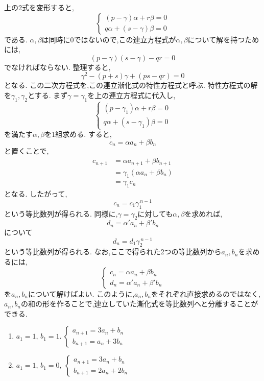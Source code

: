     上の2式を変形すると,
    \[
    \begin{cases}
      (p-\gamma)\alpha+r\beta=0\\
      q\alpha+(s-\gamma)\beta=0
    \end{cases}
    \]
    である.
    $\alpha,\beta$は同時に$0$ではないので,この連立方程式が$\alpha,\beta$について解を持つためには,
    \[
      (p-\gamma)(s-\gamma)-qr=0
    \]
    でなければならない.
    整理すると,
    \[
      \gamma^2-(p+s)\gamma+(ps-qr)=0
    \]
    となる.
    この二次方程式を,この連立漸化式の特性方程式と呼ぶ.
    特性方程式の解を$\gamma_1,\gamma_2$とする.
    まず$\gamma=\gamma_1$を上の連立方程式に代入し,
    \[
      \begin{cases}
        (p-\gamma_1)\alpha+r\beta=0\\
        q\alpha+(s-\gamma_1)\beta=0
      \end{cases}
    \]
    を満たす$\alpha,\beta$を1組求める.
    すると,
    \[
      c_n=\alpha a_n+\beta b_n
    \]
    と置くことで,
    \begin{align*}
      c_{n+1}&=\alpha a_{n+1}+\beta b_{n+1}\\
      &=\gamma_1(\alpha a_n+\beta b_n)\\
      &=\gamma_1c_n
    \end{align*}
    となる.
    したがって,
    \[
      c_n=c_1\gamma_1^{\,n-1}
    \]
    という等比数列が得られる.
    同様に,$\gamma=\gamma_2$に対しても$\alpha,\beta$を求めれば,
    \[
      d_n=\alpha' a_n+\beta' b_n
    \]
    について
    \[
      d_n=d_1\gamma_2^{\,n-1}
    \]
    という等比数列が得られる.
    なお,ここで得られた2つの等比数列から$a_n,b_n$を求めるには,
    \[
      \begin{cases}
      c_n=\alpha a_n+\beta b_n\\
      d_n=\alpha'a_n+\beta'b_n
      \end{cases}
    \]
    を$a_n,b_n$について解けばよい.
    このように,$a_n,b_n$をそれぞれ直接求めるのではなく,$a_n,b_n$の和の形を作ることで,連立していた漸化式を等比数列へと分離することができる.

    \noindent {}
    \begin{enumerate}[label=(\arabic*),parsep=3pt,format=\bookitemlink{example-system-1}{problem}{answer}]
      \item $\displaystyle a_1=1,\,b_1=1.\ \begin{cases}a_{n+1}=3a_n+b_n\\ b_{n+1}=a_n+3b_n\end{cases}$
      \item $\displaystyle a_1=1,\,b_1=0,\ \begin{cases}a_{n+1}=3a_n+b_n\\ b_{n+1}=2a_n+2b_n\end{cases}$
    \end{enumerate}

